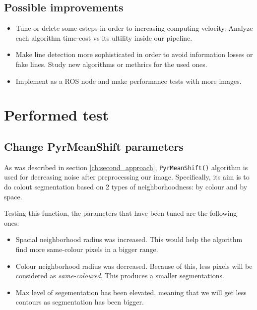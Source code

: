 \documentclass[12pt, a4paper]{article}
\begin{document}
\subsection{Possible improvements}


\begin{itemize}

    \item Tune or delete some esteps in order to increasing computing velocity. Analyze each algorithm time-cost vs its
    ultility inside our pipeline. 
    
    \item Make line detection more sophisticated in order to avoid information losses or fake lines. Study new algorithms or 
    methrics for the used ones. 
    
    \item Implement as a ROS node and make performance tests with more images.

\end{itemize}


\section{Performed test}

\subsection{Change PyrMeanShift parameters}

As was described in section \ref{ch:second_approach}, \verb|PyrMeanShift()| algorithm
is used for decreasing noise after preprocessing our image. Specifically, its
aim is to do colout segmentation based on 2 types of neighborhoodness: by colour
and by space. 

Testing this function, the parameters that have been tuned are the following 
ones: 

\begin{itemize}
    
    \item  Spacial neighborhood radius was increased. This would help the algorithm
    find more same-colour pixels in a bigger range. 
    
    \item Colour neighborhood radius was decreased. Because of this, less pixels 
    will be considered as \textit{same-coloured}. This produces a smaller segmentations.

    \item Max level of segementation has been elevated, meaning that we will get 
    less contours as segmentation has been bigger.

\end{itemize}
\end{document}
